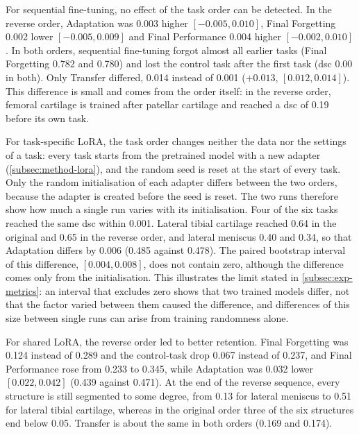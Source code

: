 For sequential fine-tuning, no effect of the task order can be detected.
In the reverse order, Adaptation was 0.003 higher $[-0.005, 0.010]$, Final Forgetting 0.002 lower $[-0.005, 0.009]$ and Final Performance 0.004 higher $[-0.002, 0.010]$.
In both orders, sequential fine-tuning forgot almost all earlier tasks (Final Forgetting 0.782 and 0.780) and lost the control task after the first task (\gls{dsc} 0.00 in both).
Only Transfer differed, 0.014 instead of 0.001 ($+0.013$, $[0.012, 0.014]$).
This difference is small and comes from the order itself: in the reverse order, femoral cartilage is trained after patellar cartilage and reached a \gls{dsc} of 0.19 before its own task.

For task-specific LoRA, the task order changes neither the data nor the settings of a task: every task starts from the pretrained model with a new adapter (\cref{subsec:method-lora}), and the random seed is reset at the start of every task.
Only the random initialisation of each adapter differs between the two orders, because the adapter is created before the seed is reset.
The two runs therefore show how much a single run varies with its initialisation.
Four of the six tasks reached the same \gls{dsc} within 0.001.
Lateral tibial cartilage reached 0.64 in the original and 0.65 in the reverse order, and lateral meniscus 0.40 and 0.34, so that Adaptation differs by 0.006 (0.485 against 0.478).
The paired bootstrap interval of this difference, $[0.004, 0.008]$, does not contain zero, although the difference comes only from the initialisation.
This illustrates the limit stated in \cref{subsec:exp-metrics}: an interval that excludes zero shows that two trained models differ, not that the factor varied between them caused the difference, and differences of this size between single runs can arise from training randomness alone.

For shared LoRA, the reverse order led to better retention.
Final Forgetting was 0.124 instead of 0.289 and the control-task drop 0.067 instead of 0.237, and Final Performance rose from 0.233 to 0.345, while Adaptation was 0.032 lower $[0.022, 0.042]$ (0.439 against 0.471).
At the end of the reverse sequence, every structure is still segmented to some degree, from 0.13 for lateral meniscus to 0.51 for lateral tibial cartilage, whereas in the original order three of the six structures end below 0.05.
Transfer is about the same in both orders (0.169 and 0.174).

